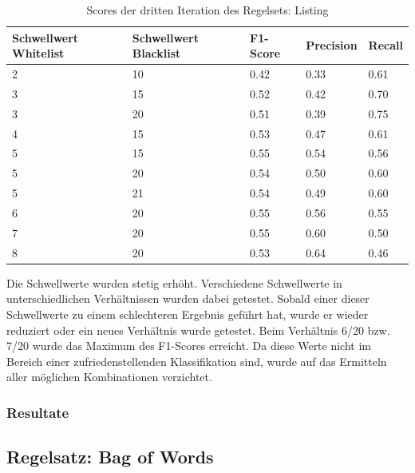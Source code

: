 \begin{table}[H]
	\caption{Scores der dritten Iteration des Regelsets: Listing}
	\centering
	\begin{tabular}{|l|l|l|l|l|}
		\hline
		Schwellwert Whitelist & Schwellwert Blacklist & F1-Score & Precision & Recall\\
		\hline
		2 & 10 & 0.42 & 0.33 & 0.61 \\
		3 & 15 & 0.52 & 0.42 & 0.70 \\
		3 & 20 & 0.51 & 0.39 & 0.75 \\
		4 & 15 & 0.53 & 0.47 & 0.61 \\
		5 & 15 & 0.55 & 0.54 & 0.56 \\
		5 & 20 & 0.54 & 0.50 & 0.60 \\
		5 & 21 & 0.54 & 0.49 & 0.60 \\
		6 & 20 & 0.55 & 0.56 & 0.55 \\
		7 & 20 & 0.55 & 0.60 & 0.50 \\
		8 & 20 & 0.53 & 0.64 & 0.46 \\
		\hline
	\end{tabular}
\end{table}
Die Schwellwerte wurden stetig erhöht.
Verschiedene Schwellwerte in unterschiedlichen Verhältnissen wurden dabei getestet.
Sobald einer dieser Schwellwerte zu einem schlechteren Ergebnis geführt hat, wurde er wieder reduziert oder ein neues Verhältnis wurde getestet.
Beim Verhältnis 6/20 bzw. 7/20 wurde das Maximum des F1-Scores erreicht.
Da diese Werte nicht im Bereich einer zufriedenstellenden Klassifikation sind, wurde auf das Ermitteln aller möglichen Kombinationen verzichtet.
\subsubsection{Resultate}
\subsection{Regelsatz: Bag of Words}
